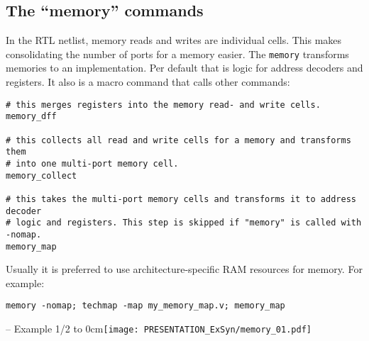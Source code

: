 
\subsection{The ``memory'' commands}

\begin{frame}[fragile]{\subsecname}
In the RTL netlist, memory reads and writes are individual cells. This makes
consolidating the number of ports for a memory easier. The {\tt memory}
transforms memories to an implementation. Per default that is logic for address
decoders and registers. It also is a macro command that calls other commands:

\begin{lstlisting}[xleftmargin=0.5cm, basicstyle=\ttfamily\fontsize{8pt}{10pt}\selectfont]
# this merges registers into the memory read- and write cells.
memory_dff

# this collects all read and write cells for a memory and transforms them
# into one multi-port memory cell.
memory_collect

# this takes the multi-port memory cells and transforms it to address decoder
# logic and registers. This step is skipped if "memory" is called with -nomap.
memory_map
\end{lstlisting}

\bigskip
Usually it is preferred to use architecture-specific RAM resources for memory.
For example:

\begin{lstlisting}[xleftmargin=0.5cm, basicstyle=\ttfamily\fontsize{8pt}{10pt}\selectfont]
memory -nomap; techmap -map my_memory_map.v; memory_map
\end{lstlisting}
\end{frame}

\begin{frame}[t, fragile]{\subsecname{} -- Example 1/2}
\vbox to 0cm{\texttt{[image: PRESENTATION\_ExSyn/memory\_01.pdf]}\vss}
\vskip-1cm
\begin{columns}
\column[t]{5cm}

\column[t]{5cm}

\end{columns}
\end{frame}

